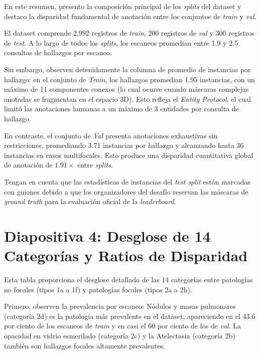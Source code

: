 \documentclass[11pt, a4paper]{article}
\begin{document}
En este resumen, presento la composición principal de los \textit{splits} del dataset y destaco la disparidad fundamental de anotación entre los conjuntos de \textit{train} y \textit{val}.

El dataset comprende 2,992 registros de \textit{train}, 200 registros de \textit{val} y 300 registros de \textit{test}. A lo largo de todos los \textit{splits}, los escaneos promedian entre 1.9 y 2.5 consultas de hallazgos por escaneo.

Sin embargo, observen detenidamente la columna de promedio de instancias por hallazgo: en el conjunto de \textit{Train}, los hallazgos promedian 1.95 instancias, con un máximo de 11 componentes conexos (lo cual ocurre cuando máscaras complejas anotadas se fragmentan en el espacio 3D). Esto refleja el \textit{Entity Protocol}, el cual limitó las anotaciones humanas a un máximo de 3 entidades por consulta de hallazgo.

En contraste, el conjunto de \textit{Val} presenta anotaciones exhaustivas sin restricciones, promediando 3.71 instancias por hallazgo y alcanzando hasta 36 instancias en casos multifocales. Esto produce una disparidad cuantitativa global de anotación de $1.91\times$ entre \textit{splits}.

Tengan en cuenta que las estadísticas de instancias del \textit{test split} están marcadas con guiones debido a que los organizadores del desafío reservan las máscaras de \textit{ground truth} para la evaluación oficial de la \textit{leaderboard}.

\bigskip

\section{Diapositiva 4: Desglose de 14 Categorías y Ratios de Disparidad}

Esta tabla proporciona el desglose detallado de las 14 categorías entre patologías no focales (tipos 1a a 1f) y patologías focales (tipos 2a a 2h).

Primero, observen la prevalencia por escaneo: Nódulos y masas pulmonares (categoría 2d) es la patología más prevalente en el dataset, apareciendo en el 43.6 por ciento de los escaneos de \textit{train} y en casi el 60 por ciento de los de \textit{val}. La opacidad en vidrio esmerilado (categoría 2c) y la Atelectasia (categoría 2b) también son hallazgos focales altamente prevalentes.
\end{document}
